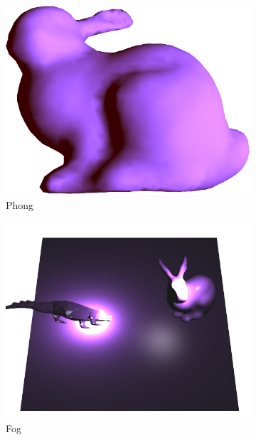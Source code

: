 \documentclass[acmsmall,review,anonymous]{acmart}
\begin{document}
\begin{figure}
		\begin{subfigure}[b]{0.45\linewidth}
		\centering
		\includegraphics[width=\linewidth]{fig/bunnygoodfront.png}
		\caption{Phong}
	\end{subfigure}
	\hfill
	\begin{subfigure}[b]{0.45\linewidth}
		\centering
		\includegraphics[width=\linewidth]{fig/fog.png}
		\caption{Fog}
	\end{subfigure}
		\begin{subfigure}[b]{0.45\linewidth}
		\centering

\end{subfigure}
\end{figure}
\end{document}
